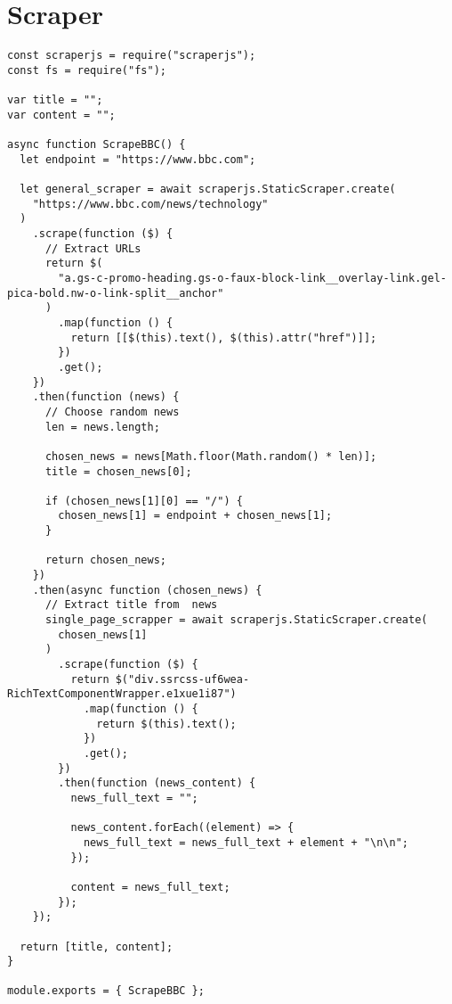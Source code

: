 \section{Scraper}
\begin{verbatim}
const scraperjs = require("scraperjs");
const fs = require("fs");

var title = "";
var content = "";

async function ScrapeBBC() {
  let endpoint = "https://www.bbc.com";

  let general_scraper = await scraperjs.StaticScraper.create(
    "https://www.bbc.com/news/technology"
  )
    .scrape(function ($) {
      // Extract URLs
      return $(
        "a.gs-c-promo-heading.gs-o-faux-block-link__overlay-link.gel-pica-bold.nw-o-link-split__anchor"
      )
        .map(function () {
          return [[$(this).text(), $(this).attr("href")]];
        })
        .get();
    })
    .then(function (news) {
      // Choose random news
      len = news.length;

      chosen_news = news[Math.floor(Math.random() * len)];
      title = chosen_news[0];

      if (chosen_news[1][0] == "/") {
        chosen_news[1] = endpoint + chosen_news[1];
      }

      return chosen_news;
    })
    .then(async function (chosen_news) {
      // Extract title from  news
      single_page_scrapper = await scraperjs.StaticScraper.create(
        chosen_news[1]
      )
        .scrape(function ($) {
          return $("div.ssrcss-uf6wea-RichTextComponentWrapper.e1xue1i87")
            .map(function () {
              return $(this).text();
            })
            .get();
        })
        .then(function (news_content) {
          news_full_text = "";

          news_content.forEach((element) => {
            news_full_text = news_full_text + element + "\n\n";
          });

          content = news_full_text;
        });
    });

  return [title, content];
}

module.exports = { ScrapeBBC };
\end{verbatim}